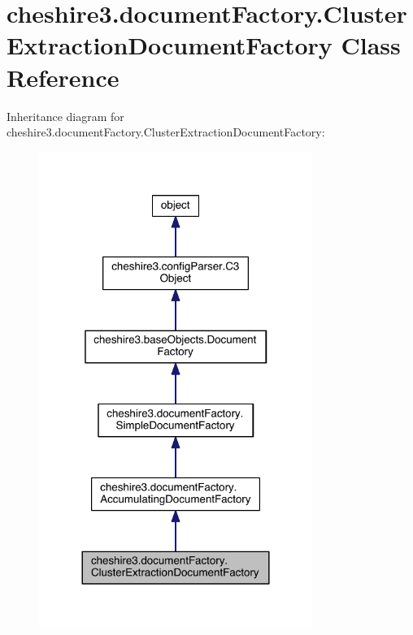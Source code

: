 \hypertarget{classcheshire3_1_1document_factory_1_1_cluster_extraction_document_factory}{\section{cheshire3.\-document\-Factory.\-Cluster\-Extraction\-Document\-Factory Class Reference}
\label{classcheshire3_1_1document_factory_1_1_cluster_extraction_document_factory}
}


Inheritance diagram for cheshire3.\-document\-Factory.\-Cluster\-Extraction\-Document\-Factory\-:
\nopagebreak
\begin{figure}[H]
\begin{center}
\leavevmode
\includegraphics[width=252pt]{classcheshire3_1_1document_factory_1_1_cluster_extraction_document_factory__inherit__graph}
\end{center}
\end{figure}


